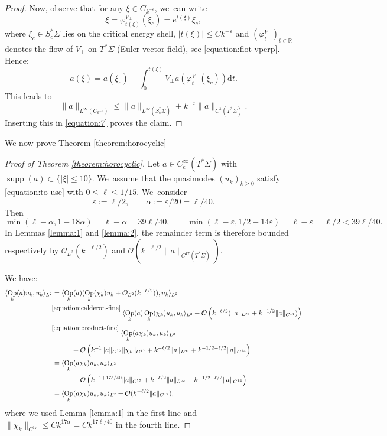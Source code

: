 \documentclass[10pt]{amsart}
\theoremstyle{plain}
\theoremstyle{definition}
\let\mc\mathcal
\newcommand{\R}{\mathbb{R}}
\let\eps\varepsilon
\newcommand{\dd}{\mathrm{d}}
\DeclareMathOperator{\comp}{c}
\DeclareMathOperator{\Op}{Op}
\DeclareMathOperator{\supp}{supp}
\begin{document}
\begin{proof}
Now, observe that for any $\xi \in C_{k^{-\eps}}$, we~can write
\[
\xi = \varphi_{t(\xi)}^{V_\perp}(\xi_c) = e^{t(\xi)}\xi_c,
\]
where $\xi_c \in S^*_c\Sigma$ lies on the critical energy shell, $|t(\xi)| \leq C k^{-\eps}$ and $(\varphi_t^{V_\perp})_{t \in \R}$ denotes the flow of $V_\perp$ on $T^*\Sigma$ (Euler vector field), see \eqref{equation:flot-vperp}. Hence:
\[
a(\xi) = a(\xi_c) + \int_0^{t(\xi)} V_\perp a(\varphi^{V_\perp}_t(\xi_c)) \dd t.
\]
This leads to
\[
\|a\|_{L^\infty(C_{k^{-\eps}})} \leq \|a\|_{L^\infty(S^*_c\Sigma)} + k^{-\eps}\|a\|_{C^1(T^*\Sigma)}.
\]
Inserting this in \eqref{equation:7} proves the claim.
\end{proof}

We now prove Theorem \ref{theorem:horocyclic}

\begin{proof}[Proof of Theorem \ref{theorem:horocyclic}]
Let $a \in C^\infty_{\comp}(T^*\Sigma)$ with $\supp(a) \subset \{|\xi| \leq 10\}$. We~assume that the quasimodes $(u_k)_{k \geq 0}$ satisfy \eqref{equation:to-use} with $0 \leq \ell \leq 1/15$. We~consider
\[
\eps := \ell/2, \qquad \alpha := \eps/20 = \ell/40.
\]
Then
\[
\min(\ell-\alpha,1-18\alpha) = \ell-\alpha = 39\ell/40, \qquad \min(\ell-\eps,1/2-14\eps)=\ell-\eps =\ell/2 < 39\ell/40.
\]
In Lemmas \ref{lemma:1} and \ref{lemma:2}, the remainder term is therefore bounded respectively by $\mc{O}_{L^2}(k^{-\ell/2})$ and $\mc{O}(k^{-\ell/2}\|a\|_{C^{17}(T^*\Sigma)})$.

We have:
\begin{align}
\langle \Op_k(a)u_k,u_k\rangle_{L^2}
&= \langle \Op_k(a)(\Op_k(\chi_k) u_k + \mc{O}_{L^2}(k^{-\ell/2})),u_k\rangle_{L^2} \notag\\
& \mkern-7mu\overset{\eqref{equation:calderon-fine}}{=} \langle \Op_k(a)\Op_k(\chi_k) u_k,u_k\rangle_{L^2} + \mc{O}\left(k^{-\ell/2}(\|a\|_{L^\infty} + k^{-1/2}\|a\|_{C^{14}})\right) \notag\\
& \mkern-7mu\overset{\eqref{equation:product-fine}}{=} \langle \Op_k(a \chi_k) u_k,u_k\rangle_{L^2} \notag\\
& \hspace{1cm}+ \mc{O}\left(k^{-1}\|a\|_{C^{17}}\|\chi_k\|_{C^{17}} + k^{-\ell/2}\|a\|_{L^\infty} + k^{-1/2-\ell/2}\|a\|_{C^{14}}\right)\label{equation:la1} \\
& = \langle \Op_k(a \chi_k) u_k,u_k\rangle_{L^2} \notag\\
& \hspace{1cm}+ \mc{O}\left(k^{-1+17\ell/40}\|a\|_{C^{17}} + k^{-\ell/2}\|a\|_{L^\infty} + k^{-1/2-\ell/2}\|a\|_{C^{14}}\right) \notag\\
& = \langle \Op_k(a \chi_k) u_k,u_k\rangle_{L^2} + \mc{O}(k^{-\ell/2}\|a\|_{C^{17}}),\notag
\end{align}
where we used Lemma \ref{lemma:1} in the first line and $\|\chi_k\|_{C^{17}} \leq C k^{17\alpha} = Ck^{17\ell/40}$ in the fourth line.


\end{proof}
\end{document}
